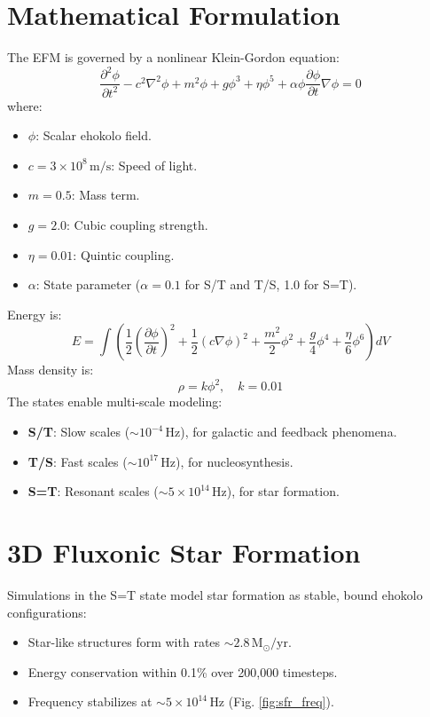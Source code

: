\documentclass[11pt]{article}
\begin{document}
\section{Mathematical Formulation}
The EFM is governed by a nonlinear Klein-Gordon equation:
\begin{equation}
\frac{\partial^2 \phi}{\partial t^2} - c^2 \nabla^2 \phi + m^2 \phi + g \phi^3 + \eta \phi^5 + \alpha \phi \frac{\partial \phi}{\partial t} \nabla \phi = 0
\end{equation}
where:
\begin{itemize}
    \item \(\phi\): Scalar ehokolo field.
    \item \(c = 3 \times 10^8 \, \text{m/s}\): Speed of light.
    \item \(m = 0.5\): Mass term.
    \item \(g = 2.0\): Cubic coupling strength.
    \item \(\eta = 0.01\): Quintic coupling.
    \item \(\alpha\): State parameter (\(\alpha = 0.1\) for S/T and T/S, 1.0 for S=T).
\end{itemize}
Energy is:
\begin{equation}
E = \int \left( \frac{1}{2} \left(\frac{\partial \phi}{\partial t}\right)^2 + \frac{1}{2} (c \nabla \phi)^2 + \frac{m^2}{2} \phi^2 + \frac{g}{4} \phi^4 + \frac{\eta}{6} \phi^6 \right) dV
\end{equation}
Mass density is:
\begin{equation}
\rho = k \phi^2, \quad k = 0.01
\end{equation}
The states enable multi-scale modeling:
\begin{itemize}
    \item \textbf{S/T}: Slow scales (\(\sim 10^{-4} \, \text{Hz}\)), for galactic and feedback phenomena.
    \item \textbf{T/S}: Fast scales (\(\sim 10^{17} \, \text{Hz}\)), for nucleosynthesis.
    \item \textbf{S=T}: Resonant scales (\(\sim 5 \times 10^{14} \, \text{Hz}\)), for star formation.
\end{itemize}

\section{3D Fluxonic Star Formation}
Simulations in the S=T state model star formation as stable, bound ehokolo configurations:
\begin{itemize}
    \item Star-like structures form with rates \(\sim 2.8 \, \text{M}_\odot/\text{yr}\).
    \item Energy conservation within 0.1\% over 200,000 timesteps.
    \item Frequency stabilizes at \(\sim 5 \times 10^{14} \, \text{Hz}\) (Fig. \ref{fig:sfr_freq}).
\end{itemize}
\end{document}
